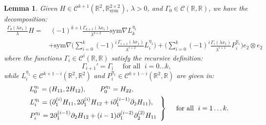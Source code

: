 \documentclass[reqno,twoside,11pt]{amsart}
\newcommand{\sym}{\mathrm{sym}}
\newcommand{\R}{\mathbb{R}}
\numberwithin{equation}{section}
\theoremstyle{plain}
\newtheorem{lemma}[theorem]{Lemma}
\theoremstyle{definition}
\begin{document}
\begin{lemma}\label{lem_IBP1}
Given  $H\in\mathcal{C}^{k+1}(\R^2,\R^{2\times 2}_\sym)$, $\lambda>0$,
and $\Gamma_0\in\mathcal{C}(\R,\R)$, we have the decomposition:
\begin{equation}\label{ibp1}
\begin{split}
\frac{\Gamma_0(\lambda x_1)}{\lambda}H = & \; (-1)^{k+1}\frac{\Gamma_{k+1}(\lambda
  x_1)}{\lambda^{k+2}} \sym\nabla L_k^{\eta_1}  \\ & + \sym\nabla
\Big(\sum_{i=0}^k(-1)^i\frac{\Gamma_{i+1}(\lambda x_1)}{\lambda^{i+2}}L_i^{\eta_1}\Big) 
+ \Big( \sum_{i=0}^{k}(-1)^i\frac{\Gamma_i(\lambda
  x_1)}{\lambda^{i+1}} P_i^{\eta_1}\Big) e_2\otimes e_2
\end{split}
\end{equation}
where the functions $\Gamma_i\in \mathcal{C}^{i}(\R,\R)$ satisfy the recursive definition:
\begin{equation}\label{recu_ibp}
\Gamma_{i+1}' = \Gamma_{i}  \quad\mbox{ for all } \; i =0\ldots k,
\end{equation}
while $L_i^{\eta_1}\in\mathcal{C}^{k+1-i}(\R^2,\R^2)$ and
$P_i^{\eta_1}\in\mathcal{C}^{k+1-i}(\R^2,\R)$ are given in:
\begin{equation}\label{coef_ibp1}
\begin{split}
& \;\; \, L_0^{\eta_1} = (H_{11}, 2H_{12}), \qquad P_0^{\eta_1} = H_{22},\\
& \left.\begin{array}{l} L_i^{\eta_1}= (\partial_1^{(i)}H_{11}, 2\partial_1^{(i)}H_{12} +
i\partial_1^{(i-1)}\partial_2H_{11}), \vspace{2mm} 
\\  P_i^{\eta_1} = 2\partial_1^{(i-1)}\partial_2H_{12} +
(i-1)\partial_1^{(i-2)}\partial_2^{(2)}H_{11} \end{array}\right\}
\quad \mbox{ for all }\; i=1\ldots k.
\end{split}
\end{equation}
\end{lemma}
\end{document}
